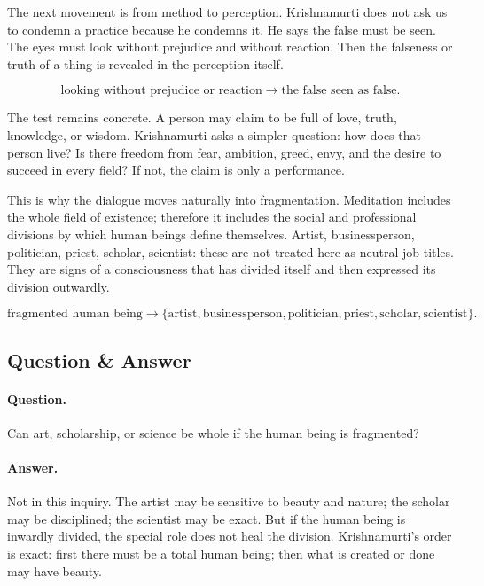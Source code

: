 The next movement is from method to perception. Krishnamurti does not ask us to condemn a practice because he condemns it. He says the false must be seen. The eyes must look without prejudice and without reaction. Then the falseness or truth of a thing is revealed in the perception itself.

\begin{equation}
\text{looking without prejudice or reaction}
\longrightarrow
\text{the false seen as false}.
\end{equation}

The test remains concrete. A person may claim to be full of love, truth, knowledge, or wisdom. Krishnamurti asks a simpler question: how does that person live? Is there freedom from fear, ambition, greed, envy, and the desire to succeed in every field? If not, the claim is only a performance.

This is why the dialogue moves naturally into fragmentation. Meditation includes the whole field of existence; therefore it includes the social and professional divisions by which human beings define themselves. Artist, businessperson, politician, priest, scholar, scientist: these are not treated here as neutral job titles. They are signs of a consciousness that has divided itself and then expressed its division outwardly.

\begin{equation}
\text{fragmented human being}
\longrightarrow
\{\text{artist}, \text{businessperson}, \text{politician},
\text{priest}, \text{scholar}, \text{scientist}\}.
\end{equation}

\subsection{Question \& Answer}

\paragraph{Question.}
Can art, scholarship, or science be whole if the human being is fragmented?

\paragraph{Answer.}
Not in this inquiry. The artist may be sensitive to beauty and nature; the scholar may be disciplined; the scientist may be exact. But if the human being is inwardly divided, the special role does not heal the division. Krishnamurti's order is exact: first there must be a total human being; then what is created or done may have beauty.

